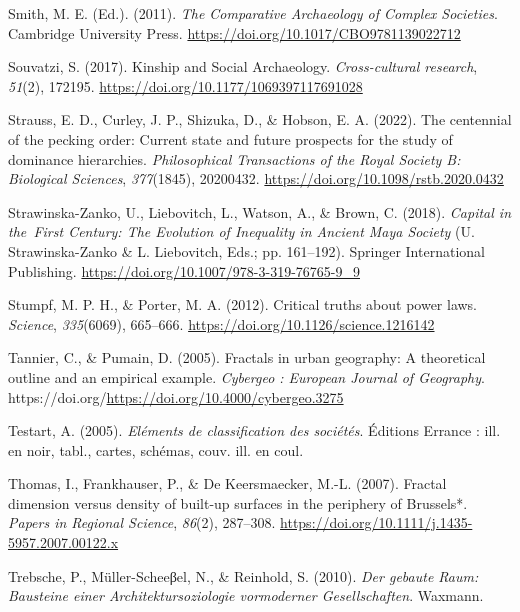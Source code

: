 \documentclass[
  12pt,
]{book}
\newlength{\cslhangindent}
\newlength{\cslentryspacingunit} %
\newenvironment{CSLReferences}[2] %
 {%
  \setlength{\parindent}{0pt}
  \ifodd #1
  \let\oldpar\par
  \def\par{\hangindent=\cslhangindent\oldpar}
  \fi
  \setlength{\parskip}{#2\cslentryspacingunit}
 }%
 {}
\begin{document}
\begin{CSLReferences}{1}{0}
\leavevmode{}%
Smith, M. E. (Ed.). (2011). \emph{The Comparative Archaeology of Complex Societies}. Cambridge University Press. \url{https://doi.org/10.1017/CBO9781139022712}

\leavevmode{}%
Souvatzi, S. (2017). Kinship and Social Archaeology. \emph{Cross-cultural research}, \emph{51}(2), 172195. \url{https://doi.org/10.1177/1069397117691028}

\leavevmode{}%
Strauss, E. D., Curley, J. P., Shizuka, D., \& Hobson, E. A. (2022). The centennial of the pecking order: Current state and future prospects for the study of dominance hierarchies. \emph{Philosophical Transactions of the Royal Society B: Biological Sciences}, \emph{377}(1845), 20200432. \url{https://doi.org/10.1098/rstb.2020.0432}

\leavevmode{}%
Strawinska-Zanko, U., Liebovitch, L., Watson, A., \& Brown, C. (2018). \emph{Capital in the~First Century: The Evolution of Inequality in Ancient Maya Society} (U. Strawinska-Zanko \& L. Liebovitch, Eds.; pp. 161--192). Springer International Publishing. \url{https://doi.org/10.1007/978-3-319-76765-9_9}

\leavevmode{}%
Stumpf, M. P. H., \& Porter, M. A. (2012). Critical truths about power laws. \emph{Science}, \emph{335}(6069), 665--666. \url{https://doi.org/10.1126/science.1216142}

\leavevmode{}%
Tannier, C., \& Pumain, D. (2005). Fractals in urban geography: A theoretical outline and an empirical example. \emph{Cybergeo : European Journal of Geography}. https://doi.org/\url{https://doi.org/10.4000/cybergeo.3275}

\leavevmode{}%
Testart, A. (2005). \emph{Eléments de classification des sociétés}. Éditions Errance : ill. en noir, tabl., cartes, schémas, couv. ill. en coul.

\leavevmode{}%
Thomas, I., Frankhauser, P., \& De Keersmaecker, M.-L. (2007). Fractal dimension versus density of built-up surfaces in the periphery of Brussels*. \emph{Papers in Regional Science}, \emph{86}(2), 287--308. \url{https://doi.org/10.1111/j.1435-5957.2007.00122.x}

\leavevmode{}%
Trebsche, P., Müller-Scheeβel, N., \& Reinhold, S. (2010). \emph{Der gebaute Raum: Bausteine einer Architektursoziologie vormoderner Gesellschaften}. Waxmann.


\end{CSLReferences}
\end{document}
